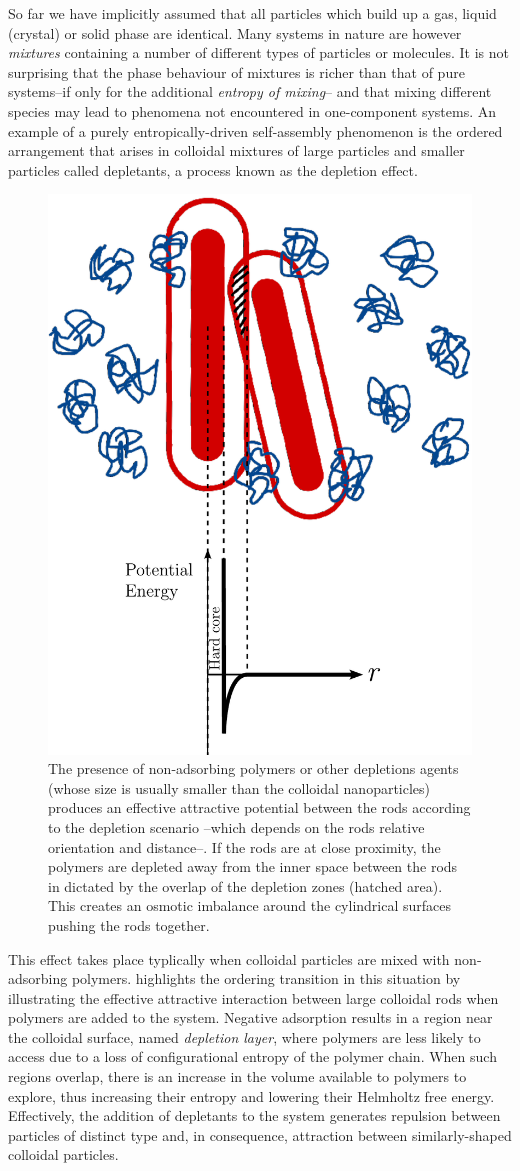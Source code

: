 So far we have implicitly assumed that all particles which build up a gas, liquid (crystal) or solid phase are identical. Many systems in nature are however {\em mixtures} containing a number of different types of particles or molecules. It is not surprising that the phase behaviour of mixtures is richer than that of pure systems--if only for the additional {\em entropy of mixing}-- and that mixing different species may lead to  phenomena not encountered in one-component systems. An example of a purely entropically-driven self-assembly phenomenon is the ordered arrangement that arises in colloidal mixtures of large particles and smaller particles called depletants, a process known as the depletion effect.

\begin{figure}
\includegraphics[width= 0.4 \columnwidth]{figures/chapter-1/depletion}
\caption{ \label{introfig2} The presence of non-adsorbing polymers or other depletions agents (whose size is usually smaller than the colloidal nanoparticles) produces an effective attractive potential between the rods according to the depletion scenario --which depends on the rods relative orientation and distance--. If the rods are at close proximity, the polymers are depleted away from the inner space between the rods in dictated by the overlap of the depletion zones (hatched area). This creates an osmotic imbalance around the cylindrical surfaces pushing the rods together.  }
\end{figure}

This effect takes place typlically when colloidal particles are mixed with non-adsorbing polymers.  highlights the ordering transition in this situation by illustrating the effective attractive interaction between large colloidal rods when polymers are added to the system. Negative adsorption results in a region near the colloidal surface, named {\em depletion layer}, where polymers are less likely to access due to a loss of configurational entropy of the polymer chain. When such regions overlap, there is an increase in the volume available to polymers to explore, thus increasing their entropy and lowering their Helmholtz free energy. Effectively, the addition of depletants to the system generates repulsion between particles of distinct type and, in consequence, attraction between similarly-shaped colloidal particles.

